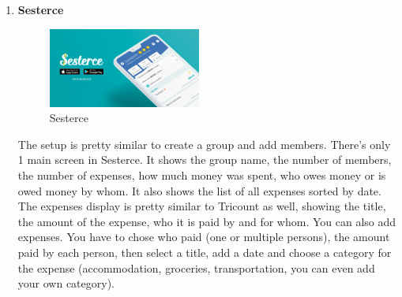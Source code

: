 \documentclass[conference]{IEEEtran}
\begin{document}
\begin{enumerate}
    \item\textbf{Sesterce} \\
        \begin{figure}[htbp]
            \centerline{\includegraphics[width=50mm,scale=0.5]{img/logo-sesterce.png}}
            \caption{Sesterce}
            \label{fig:my_label}
        \end{figure}
        \newline
        The setup is pretty similar to create a group and add members.
        \newline
        There's only 1 main screen in Sesterce. It shows the group name, the number of members, the number of expenses, how much money was spent, who owes money or is owed money by whom. It also shows the list of all expenses sorted by date. The expenses display is pretty similar to Tricount as well, showing the title, the amount of the expense, who it is paid by and for whom. You can also add expenses. You have to chose who paid (one or multiple persons), the amount paid by each person, then select a title, add a date and choose a category for the expense (accommodation, groceries, transportation, you can even add your own category).  
\end{enumerate}
\end{document}
